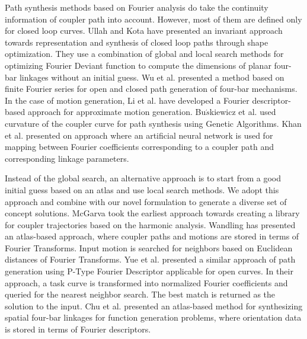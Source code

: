 \documentclass[twocolumn,10pt]{asme2ej}
\begin{document}
Path synthesis methods based on Fourier analysis do take the continuity information of coupler path into account.
However, most of them are defined only for closed loop curves.
Ullah and Kota\cite{ullah1997} have presented an invariant approach towards representation and synthesis of closed loop paths through shape optimization.
They use a combination of global and local search methods for optimizing Fourier Deviant function to compute the dimensions of planar four-bar linkages without an initial guess.
Wu et al.\cite{wu2011} presented a method based on finite Fourier series for open and closed path generation of four-bar mechanisms.
In the case of motion generation, Li et al.\cite{li2016} have developed a Fourier descriptor-based approach for approximate motion generation.
Bu$\acute{s}$kiewicz et al.\cite{Buskiewicz2009} used curvature of the coupler curve for path synthesis using Genetic Algorithms.
Khan et al.\cite{khan2015} presented on approach where an artificial neural network is used for mapping between Fourier coefficients corresponding to a coupler path and corresponding linkage parameters.

Instead of the global search, an alternative approach is to start from a good initial guess based on an atlas and use local search methods.
We adopt this approach and combine with our novel formulation to generate a diverse set of concept solutions.
McGarva\cite{mcgarva1994} took the earliest approach towards creating a library for coupler trajectories based on the harmonic analysis.
Wandling\cite{wandling2000} has presented an atlas-based approach, where coupler paths and motions are stored in terms of Fourier Transforms.
Input motion is searched for neighbors based on Euclidean distances of Fourier Transforms.
Yue et al.\cite{yue-pathgen2011} presented a similar approach of path generation using P-Type Fourier Descriptor applicable for open curves.
In their approach, a task curve is transformed into normalized Fourier coefficients and queried for the nearest neighbor search.
The best match is returned as the solution to the input.
Chu et al.\cite{chu2010} presented an atlas-based method for synthesizing spatial four-bar linkages for function generation problems, where orientation data is stored in terms of Fourier descriptors.
\end{document}
